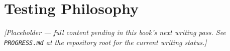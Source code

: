 \chapter{Testing Philosophy}
\label{ch:testing-philosophy}

\emph{[Placeholder --- full content pending in this book's next writing pass. See \texttt{PROGRESS.md} at the repository root for the current writing status.]}
